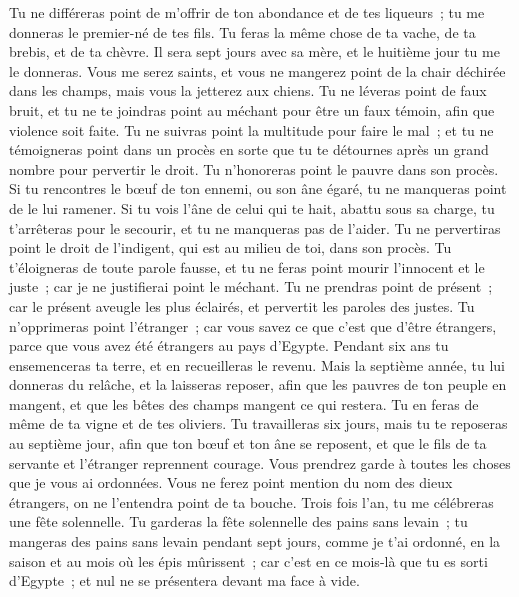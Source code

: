 \begin{multicols}{2}
Tu ne différeras point de m'offrir de ton abondance et de tes liqueurs~; tu me donneras le premier-né de tes fils.
Tu feras la même chose de ta vache, de ta brebis, et de ta chèvre. Il sera sept jours avec sa mère, et le huitième jour tu me le donneras.
Vous me serez saints, et vous ne mangerez point de la chair déchirée dans les champs, mais vous la jetterez aux chiens.
\VerseOne{}Tu ne léveras point de faux bruit, et tu ne te joindras point au méchant pour être un faux témoin, afin que violence soit faite.
Tu ne suivras point la multitude pour faire le mal~; et tu ne témoigneras point dans un procès en sorte que tu te détournes après un grand nombre pour pervertir le droit.
Tu n'honoreras point le pauvre dans son procès.
Si tu rencontres le bœuf de ton ennemi, ou son âne égaré, tu ne manqueras point de le lui ramener.
Si tu vois l'âne de celui qui te hait, abattu sous sa charge, tu t'arrêteras pour le secourir, et tu ne manqueras pas de l'aider.
Tu ne pervertiras point le droit de l'indigent, qui est au milieu de toi, dans son procès.
Tu t'éloigneras de toute parole fausse, et tu ne feras point mourir l'innocent et le juste~; car je ne justifierai point le méchant.
Tu ne prendras point de présent~; car le présent aveugle les plus éclairés, et pervertit les paroles des justes.
Tu n'opprimeras point l'étranger~; car vous savez ce que c'est que d'être étrangers, parce que vous avez été étrangers au pays d'Egypte.
Pendant six ans tu ensemenceras ta terre, et en recueilleras le revenu.
Mais la septième année, tu lui donneras du relâche, et la laisseras reposer, afin que les pauvres de ton peuple en mangent, et que les bêtes des champs mangent ce qui restera. Tu en feras de même de ta vigne et de tes oliviers.
Tu travailleras six jours, mais tu te reposeras au septième jour, afin que ton bœuf et ton âne se reposent, et que le fils de ta servante et l'étranger reprennent courage.
Vous prendrez garde à toutes les choses que je vous ai ordonnées. Vous ne ferez point mention du nom des dieux étrangers, on ne l'entendra point de ta bouche.
Trois fois l'an, tu me célébreras une fête solennelle.
Tu garderas la fête solennelle des pains sans levain~; tu mangeras des pains sans levain pendant sept jours, comme je t'ai ordonné, en la saison et au mois où les épis mûrissent~; car c'est en ce mois-là que tu es sorti d'Egypte~; et nul ne se présentera devant ma face à vide.

\end{multicols}
